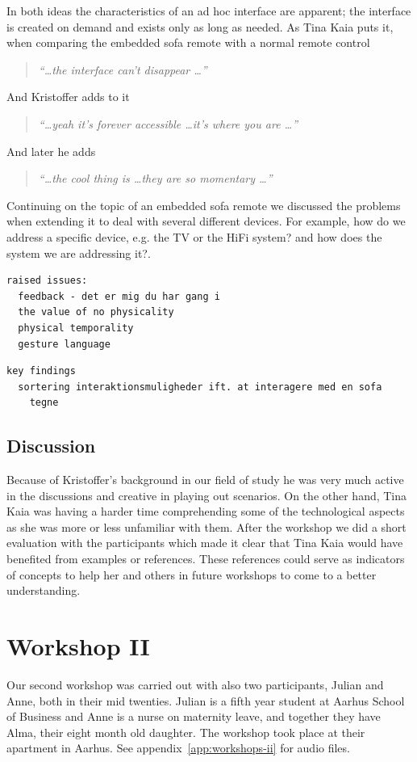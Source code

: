 In both ideas the characteristics of an ad hoc interface are apparent; the interface is created on demand and exists only as long as needed.
As Tina Kaia puts it, when comparing the embedded sofa remote with a normal remote control
\begin{quotation}
  \emph{``\dots the interface can't disappear \dots''}
\end{quotation}
And Kristoffer adds to it
\begin{quotation}
  \emph{``\dots yeah it's forever accessible \dots it's where you are \dots''}
\end{quotation}
And later he adds
\begin{quotation}
  \emph{``\dots the cool thing is \dots they are so momentary \dots''}
\end{quotation}

Continuing on the topic of an embedded sofa remote we discussed the problems when extending it to deal with several different devices.
For example, how do we address a specific device, e.g. the TV or the HiFi system? and how does the system we are addressing it?.


\begin{verbatim}
raised issues:
  feedback - det er mig du har gang i
  the value of no physicality
  physical temporality
  gesture language
\end{verbatim}

\begin{verbatim}
key findings
  sortering interaktionsmuligheder ift. at interagere med en sofa
    tegne
\end{verbatim}

\subsection{Discussion}
\label{ch:workshops:workshop-i:discussion}
Because of Kristoffer's background in our field of study he was very much active in the discussions and creative in playing out scenarios.
On the other hand, Tina Kaia was having a harder time comprehending some of the technological aspects as she was more or less unfamiliar with them.
After the workshop we did a short evaluation with the participants which made it clear that Tina Kaia would have benefited from examples or references.
These references could serve as indicators of concepts to help her and others in future workshops to come to a better understanding.

\section{Workshop II}
\label{ch:workshops:workshop-ii}
Our second workshop was carried out with also two participants, Julian and Anne, both in their mid twenties.
Julian is a fifth year student at Aarhus School of Business and Anne is a nurse on maternity leave, and together they have Alma, their eight month old daughter.
The workshop took place at their apartment in Aarhus.
See appendix~\ref{app:workshops-ii} for  audio files.

